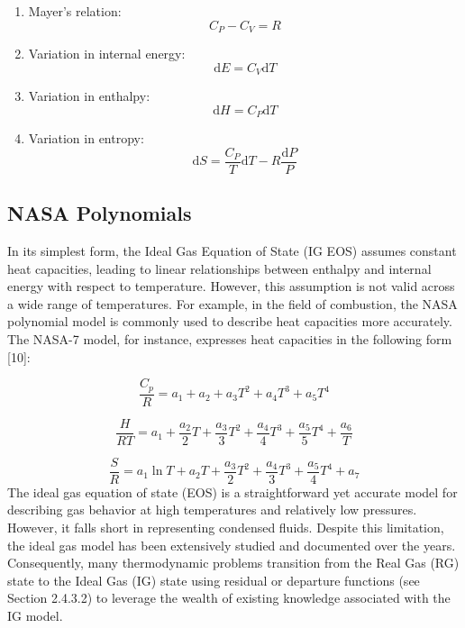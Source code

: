 	\begin{enumerate}
		\item Mayer's relation:
		\begin{equation}
			C_P - C_V = R
		\end{equation}

		\item Variation in internal energy:
		\begin{equation}
			\mathrm{d}E = C_V\mathrm{d}T
		\end{equation}

		\item Variation in enthalpy:
		\begin{equation}
			\mathrm{d}H = C_P\mathrm{d}T
		\end{equation}

		\item Variation in entropy:
		\begin{equation}
			\mathrm{d}S = \frac{C_P}{T}\mathrm{d}T - R\frac{\mathrm{d}P}{P}
		\end{equation}

	\end{enumerate}

	\subsection{NASA Polynomials}
	
	In its simplest form, the Ideal Gas Equation of State (IG EOS) assumes constant heat capacities, leading to linear relationships between enthalpy and internal energy 
	with respect to temperature. However, this assumption is not valid across a wide range of temperatures. For example, in the field of combustion, the NASA polynomial 
	model is commonly used to describe heat capacities more accurately. The NASA-7 model, for instance, expresses heat capacities in the following form [10]:

	\begin{equation}
		\frac{C_p}{R} = a_1 + a_2 + a_3 T^2 + a_4 T^3 + a_5 T^4
	\end{equation}

	\begin{equation}
		\frac{H}{RT} = a_1 + \frac{a_2}{2}T + \frac{a_3}{3}T^2 + \frac{a_4}{4}T^3 + \frac{a_5}{5}T^4 + \frac{a_6}{T}
	\end{equation}

	\begin{equation}
		\frac{S}{R} = a_1 \ln T + a_2 T + \frac{a_3}{2}T^2 + \frac{a_4}{3}T^3 + \frac{a_5}{4}T^4 + a_7
	\end{equation}
	The ideal gas equation of state (EOS) is a straightforward yet accurate model for describing gas behavior at high temperatures and relatively low pressures. 
	However, it falls short in representing condensed fluids. Despite this limitation, the ideal gas model has been extensively studied and documented over the years. 
	Consequently, many thermodynamic problems transition from the Real Gas (RG) state to the Ideal Gas (IG) state using residual or departure functions (see Section 2.4.3.2)
	to leverage the wealth of existing knowledge associated with the IG model.


